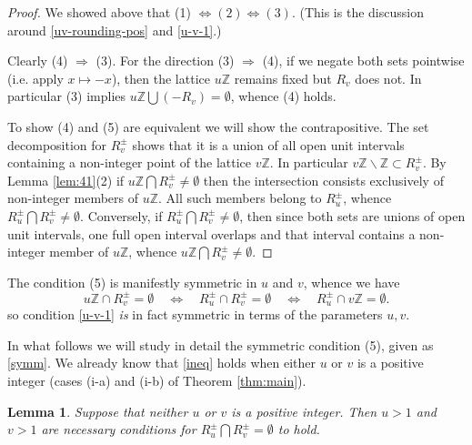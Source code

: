 \documentclass[12pt,letterpaper, reqno]{amsart}
\newtheorem{lem}[thm]{Lemma}
\theoremstyle{definition}
\theoremstyle{remark}
\newcommand{\ZZ}{\ensuremath{\mathbb{Z}}}
\newcommand{\R}{{R}}
\begin{document}
\begin{proof}
We showed above  that (1) $\Leftrightarrow (2) \Leftrightarrow (3)$. 
(This is the discussion around  \eqref{uv-rounding-pos} and \eqref{u-v-1}.)

Clearly (4) $\Rightarrow$ (3).
For the direction (3) $\Rightarrow$ (4), if  we negate both sets pointwise (i.e. apply $x\mapsto -x$),
then  the lattice $u\ZZ$ remains fixed but $\R_v$ does not. 
In particular (3) implies
$u\ZZ \bigcup (-\R_v) = \emptyset$, whence (4) holds.

To show (4) and (5) are equivalent we will show the contrapositive. The set decomposition
 for $\R_v^{\pm}$ shows that it is a union of all open unit intervals
 containing a  non-integer point of the lattice $v\ZZ$. In particular  
 $v \ZZ \smallsetminus \ZZ \subset \R_v^{\pm}$. 
By Lemma \ref{lem:41}(2)  if $u\ZZ \bigcap \R_v^{\pm} \ne \emptyset$ then  the intersection
consists exclusively of  non-integer members of $u\ZZ$. All such members belong to
$\R_u^{\pm}$, whence $\R_u^{\pm} \bigcap \R_v^{\pm} \ne \emptyset$.
Conversely, if $\R_u^{\pm} \bigcap \R_v^{\pm} \ne \emptyset$, then
since both sets are unions of open unit intervals, one full open interval overlaps
and that interval contains a non-integer member of $u\ZZ$, whence $u\ZZ \bigcap \R_v^{\pm} \ne \emptyset.$
\end{proof}

The condition (5) is manifestly symmetric in $u$ and $v$, whence we have
\begin{equation}\label{symm}
u\ZZ\cap \R^\pm_v =\emptyset \quad\Leftrightarrow\quad \R^\pm_u\cap \R^\pm_v 
= \emptyset \quad \Leftrightarrow \quad \R^\pm_u\cap v\ZZ = \emptyset.
\end{equation} 
so  condition \eqref{u-v-1} {\em is} in fact {symmetric} in terms of the parameters $u,v$.
  
In what follows we will study in detail  the symmetric condition (5), given as \eqref{symm}.
We already know that  \eqref{ineq} holds when either $u$ or $v$ is
a positive integer (cases (i-a) and (i-b) of Theorem \ref{thm:main}). 
  
  
\begin{lem}\label{lem:43a}
Suppose that neither $u$ or $v$ is a positive integer. 
Then $u>1$ and $v>1$ are
 necessary conditions for 
$\R_u^{\pm} \bigcap \R_v^{\pm} = \emptyset$
to hold.
\end{lem}
\end{document}
